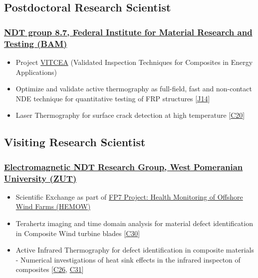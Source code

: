 \documentclass{my_cv}%
\begin{document}
\subsection{Postdoctoral Research Scientist}
\subsubsection{\href{https://www.bam.de/Navigation/DE/Home/home.html}{NDT group 8.7, Federal Institute for Material Research and Testing (BAM)}}
\begin{itemize}[leftmargin=0.15in]
\setlength\itemsep{-0.1em}
\color{mygray}
\item Project \href{http://projects.npl.co.uk/vitcea/}{VITCEA} (Validated Inspection Techniques for Composites in Energy Applications) 
\item Optimize and validate active thermography as full-field, fast and non-contact NDE technique for quantitative testing of FRP structures [\textcolor{mypink}{\hyperref[J14]{J14}}]
\item Laser Thermography for surface crack detection at high temperature [\textcolor{mypink}{\hyperref[C20]{C20}}]
\end{itemize}
{\color{mygray1} \hdashrule[0.1ex]{18.8cm}{0.2mm}{1mm}}
\subsection{Visiting Research Scientist}
\subsubsection{\href{https://innowacje.zut.edu.pl/cooperationoffer/electromagnetic-methods-non-destructive-testing}{Electromagnetic NDT Research Group, West Pomeranian University (ZUT)}}
\begin{itemize}[leftmargin=0.15in]
\setlength\itemsep{-0.1em}
\color{mygray}
\item Scientific Exchange as part of \href{https://cordis.europa.eu/project/id/269202/results}{FP7 Project: Health Monitoring of Offshore Wind Farms (HEMOW)}
\item Terahertz imaging and time domain analysis for material defect identification in Composite Wind turbine blades [\textcolor{mypink}{\hyperref[C30]{C30}}]
\item Active Infrared Thermography for defect identification in composite materials - Numerical investigations of heat sink effects in the infrared inspecton of composites [\textcolor{mypink}{\hyperref[C26]{C26}}, \textcolor{mypink}{\hyperref[C31]{C31}}]
\end{itemize}
{\color{mygray1} \hdashrule[0.1ex]{18.8cm}{0.2mm}{1mm}}
\end{document}
